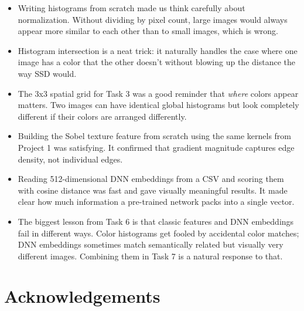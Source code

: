 \documentclass[11pt,letterpaper]{article}
\begin{document}
\begin{itemize}
    \item Writing histograms from scratch made us think carefully about
        normalization. Without dividing by pixel count, large images would always
        appear more similar to each other than to small images, which is wrong.
    \item Histogram intersection is a neat trick: it naturally handles the
        case where one image has a color that the other doesn't without blowing
        up the distance the way SSD would.
    \item The 3x3 spatial grid for Task 3 was a good reminder that \emph{where}
        colors appear matters. Two images can have identical global histograms
        but look completely different if their colors are arranged differently.
    \item Building the Sobel texture feature from scratch using the same kernels
        from Project 1 was satisfying. It confirmed that gradient magnitude
        captures edge density, not individual edges.
    \item Reading 512-dimensional DNN embeddings from a CSV and scoring them
        with cosine distance was fast and gave visually meaningful results.
        It made clear how much information a pre-trained network packs into
        a single vector.
    \item The biggest lesson from Task 6 is that classic features and DNN
        embeddings fail in different ways. Color histograms get fooled by
        accidental color matches; DNN embeddings sometimes match semantically
        related but visually very different images. Combining them in Task 7
        is a natural response to that.
\end{itemize}

\section*{Acknowledgements}
\end{document}
